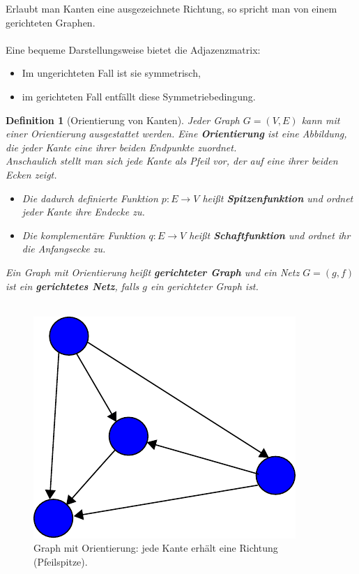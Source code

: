 \documentclass[11pt,a4paper,leqno]{report}
\newtheorem{definition}[theorem]{Definition}
\numberwithin{equation}{chapter}
\begin{document}
Erlaubt man Kanten eine ausgezeichnete Richtung, so spricht man von einem gerichteten Graphen.\\
\\
Eine bequeme Darstellungsweise bietet die Adjazenzmatrix:
\begin{itemize}
	\item Im ungerichteten Fall ist sie symmetrisch,
	\item im gerichteten Fall entfällt diese Symmetriebedingung.
\end{itemize}
\begin{definition}[Orientierung von Kanten]
	Jeder Graph $G=(V,E)$ kann mit einer Orientierung ausgestattet werden. Eine \textbf{Orientierung} ist eine Abbildung, die jeder Kante eine ihrer beiden Endpunkte zuordnet.\\
	Anschaulich stellt man sich jede Kante als Pfeil vor, der auf eine ihrer beiden Ecken zeigt.
	\begin{itemize}
		\item Die dadurch definierte Funktion $p:E \to V$ heißt \textbf{Spitzenfunktion} und ordnet jeder Kante ihre Endecke zu.
		\item Die komplementäre Funktion $q:E \to V$ heißt \textbf{Schaftfunktion} und ordnet ihr die Anfangsecke zu.
	\end{itemize}
Ein Graph mit Orientierung heißt \textbf{gerichteter Graph} und ein Netz $G=(g,f)$ ist ein \textbf{gerichtetes Netz}, falls $g$ ein gerichteter Graph ist.\\
\\
\end{definition}
\begin{figure}[H]
	\begin{center}
		\includegraphics[scale=0.4]{Abbildungen/graph_1_orient.pdf}
		\caption{Graph mit Orientierung: jede Kante erhält eine Richtung (Pfeilspitze).}
	\end{center}
\end{figure}
\end{document}
